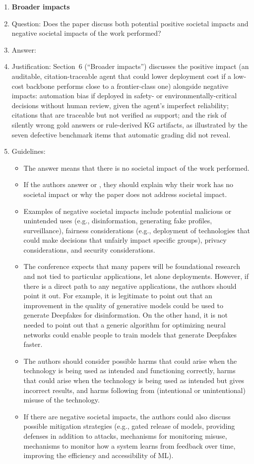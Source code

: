 \begin{enumerate}
\item {\bf Broader impacts}
    \item[] Question: Does the paper discuss both potential positive societal impacts and negative societal impacts of the work performed?
    \item[] Answer: \answerYes{}
    \item[] Justification: Section~6 (``Broader impacts'') discusses the positive impact (an auditable, citation-traceable agent that could lower deployment cost if a low-cost backbone performs close to a frontier-class one) alongside negative impacts: automation bias if deployed in safety- or environmentally-critical decisions without human review, given the agent's imperfect reliability; citations that are traceable but not verified as support; and the risk of silently wrong gold answers or rule-derived KG artifacts, as illustrated by the seven defective benchmark items that automatic grading did not reveal.
    \item[] Guidelines:
    \begin{itemize}
        \item The answer \answerNA{} means that there is no societal impact of the work performed.
        \item If the authors answer \answerNA{} or \answerNo, they should explain why their work has no societal impact or why the paper does not address societal impact.
        \item Examples of negative societal impacts include potential malicious or unintended uses (e.g., disinformation, generating fake profiles, surveillance), fairness considerations (e.g., deployment of technologies that could make decisions that unfairly impact specific groups), privacy considerations, and security considerations.
        \item The conference expects that many papers will be foundational research and not tied to particular applications, let alone deployments. However, if there is a direct path to any negative applications, the authors should point it out. For example, it is legitimate to point out that an improvement in the quality of generative models could be used to generate Deepfakes for disinformation. On the other hand, it is not needed to point out that a generic algorithm for optimizing neural networks could enable people to train models that generate Deepfakes faster.
        \item The authors should consider possible harms that could arise when the technology is being used as intended and functioning correctly, harms that could arise when the technology is being used as intended but gives incorrect results, and harms following from (intentional or unintentional) misuse of the technology.
        \item If there are negative societal impacts, the authors could also discuss possible mitigation strategies (e.g., gated release of models, providing defenses in addition to attacks, mechanisms for monitoring misuse, mechanisms to monitor how a system learns from feedback over time, improving the efficiency and accessibility of ML).
    \end{itemize}
    

\end{enumerate}

